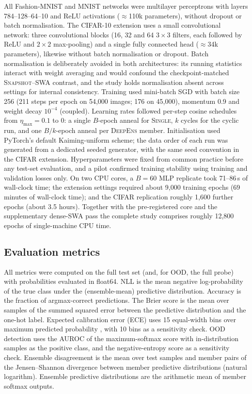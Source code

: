 \documentclass[11pt,a4paper]{article}
\newcommand{\deepens}{\textsc{DeepEns}}
\newcommand{\snapshot}{\textsc{Snapshot}}
\newcommand{\swa}{\textsc{SWA}}
\newcommand{\single}{\textsc{Single}}
\begin{document}
All Fashion-MNIST and MNIST networks were multilayer perceptrons with layers
784--128--64--10 and ReLU activations ($\approx$110k parameters), without
dropout or batch normalisation. The CIFAR-10 extension uses a small
convolutional network: three convolutional blocks (16, 32 and 64
$3\times3$ filters, each followed by ReLU and $2\times2$ max-pooling) and a
single fully connected head ($\approx$34k parameters), likewise without batch
normalisation or dropout. Batch normalisation is deliberately avoided in
both architectures: its running statistics interact with weight averaging
and would confound the checkpoint-matched \snapshot{}--\swa{} contrast, and
the study holds normalisation absent across settings for internal
consistency. Training used mini-batch SGD with batch size 256 (211 steps
per epoch on 54{,}000 images; 176 on 45{,}000), momentum 0.9 and weight
decay $10^{-4}$ (coupled). Learning rates followed per-step cosine schedules
from $\eta_{\max}=0.1$ to $0$: a single $B$-epoch anneal for \single{}, $k$
cycles for the cyclic run, and one $B/k$-epoch anneal per \deepens{}
member. Initialisation used PyTorch's default Kaiming-uniform scheme; the
data order of each run was generated from a dedicated seeded generator, with
the same seed convention in the CIFAR extension. Hyperparameters were
fixed from common practice before any test-set evaluation, and a pilot
confirmed training stability using training and validation losses only. On
two CPU cores, a $B=60$ MLP replicate took 71--86\,s of wall-clock time; the
extension settings required about 9{,}000 training epochs (69 minutes of
wall-clock time); and the CIFAR replication roughly 1{,}600 further epochs
(about 3.5 hours). Together with the pre-registered core and the
supplementary dense-\swa{} pass the complete study comprises roughly 12{,}800
epochs of single-machine CPU time.

\subsection{Evaluation metrics}\label{sec:metrics}

All metrics were computed on the full test set (and, for OOD, the full
probe) with probabilities evaluated in float64. NLL is the mean negative
log-probability of the true class under the (ensemble-mean) predictive
distribution. Accuracy is the fraction of argmax-correct predictions. The
Brier score is the mean over samples of the summed squared error between
the predictive distribution and the one-hot label. Expected calibration
error (ECE) uses 15 equal-width bins over maximum predicted probability
\citep{naeini2015,guo2017}, with 10 bins as a sensitivity check. OOD
detection uses the AUROC of the maximum-softmax score
\citep{hendrycks2017} with in-distribution samples as the positive class,
and the negative-entropy score as a sensitivity check. Ensemble disagreement
is the mean over test samples and member pairs of the Jensen--Shannon
divergence between member predictive distributions (natural logarithm).
Ensemble predictive distributions are the arithmetic mean of member softmax
outputs.
\end{document}
